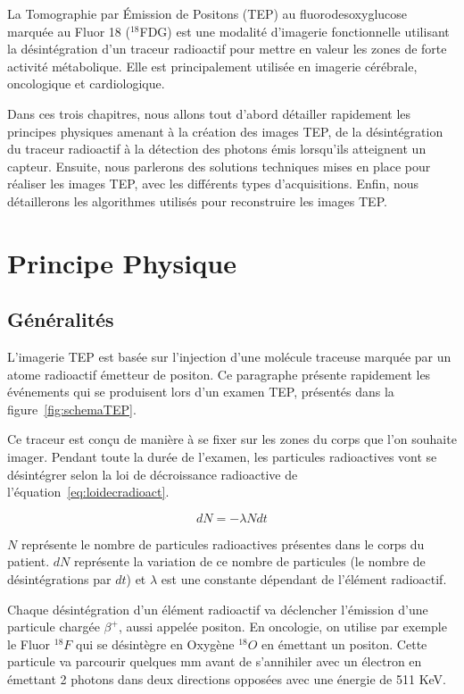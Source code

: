 
\label{lab:chapPET}
La Tomographie par \'Emission de Positons (TEP) au fluorodesoxyglucose marquée au Fluor 18 ($^{18}$FDG) est une modalité d'imagerie fonctionnelle utilisant la désintégration d'un traceur radioactif pour mettre en valeur les zones de forte activité métabolique. Elle est principalement utilisée en imagerie cérébrale, oncologique et cardiologique.


Dans ces trois chapitres, nous allons tout d'abord détailler rapidement les principes physiques amenant à la création des images TEP, de la désintégration du traceur radioactif à la détection des photons émis lorsqu'ils atteignent un capteur. Ensuite, nous parlerons des solutions techniques mises en place pour réaliser les images TEP, avec les différents types d'acquisitions. Enfin, nous détaillerons les algorithmes utilisés pour reconstruire les images TEP.

 
\chapter{Principe Physique}

	\section{Généralités}

L'imagerie TEP est basée sur l'injection d'une molécule traceuse marquée par un atome radioactif émetteur de positon. Ce paragraphe présente rapidement les événements qui se produisent lors d'un examen TEP, présentés dans la figure~\ref{fig:schemaTEP}.

Ce traceur est conçu de manière à se fixer sur les zones du corps que l'on souhaite imager. Pendant toute la durée de l'examen, les particules radioactives vont se désintégrer selon la loi de décroissance radioactive de l'équation~\ref{eq:loidecradioact}.

\begin{equation}
	dN = - \lambda N dt
	\label{eq:loidecradioact}
\end{equation}

$N$ représente le nombre de particules radioactives présentes dans le corps du patient. $dN$ représente la variation de ce nombre de particules (le nombre de désintégrations par $dt$) et $\lambda$ est une constante dépendant de l'élément radioactif.

Chaque désintégration d'un élément radioactif va déclencher l'émission d'une particule chargée $\beta^+$, aussi appelée positon. En oncologie, on utilise par exemple le Fluor $^{18}F$ qui se désintègre en Oxygène $^{18}O$ en émettant un positon. Cette particule va parcourir quelques mm avant de s'annihiler avec un électron en émettant 2 photons dans deux directions opposées avec une énergie de 511 KeV.

